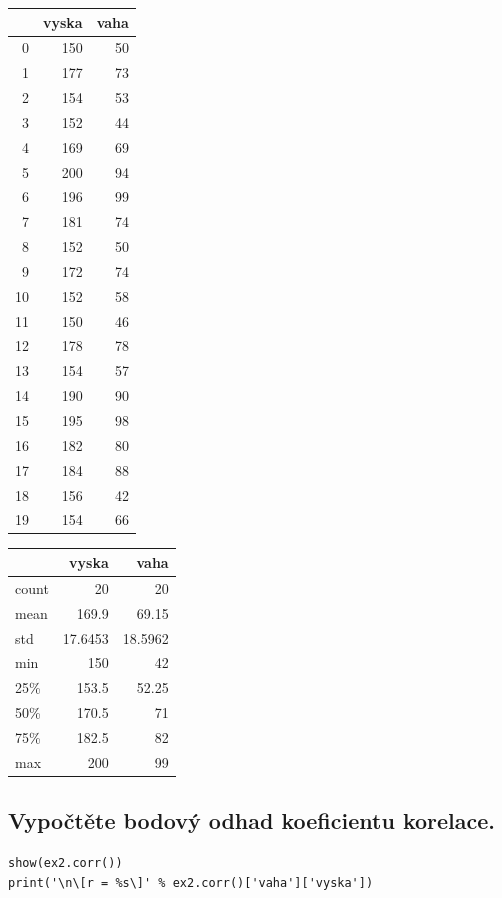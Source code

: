 \documentclass[11pt,titlepage]{article}
\begin{document}
\begin{center}
\begin{tabular}{rrr}
 & vyska & vaha\\
\hline
0 & 150 & 50\\
1 & 177 & 73\\
2 & 154 & 53\\
3 & 152 & 44\\
4 & 169 & 69\\
5 & 200 & 94\\
6 & 196 & 99\\
7 & 181 & 74\\
8 & 152 & 50\\
9 & 172 & 74\\
10 & 152 & 58\\
11 & 150 & 46\\
12 & 178 & 78\\
13 & 154 & 57\\
14 & 190 & 90\\
15 & 195 & 98\\
16 & 182 & 80\\
17 & 184 & 88\\
18 & 156 & 42\\
19 & 154 & 66\\
\end{tabular}
\end{center}

\begin{center}
\begin{tabular}{lrr}
 & vyska & vaha\\
\hline
count & 20 & 20\\
mean & 169.9 & 69.15\\
std & 17.6453 & 18.5962\\
min & 150 & 42\\
25\% & 153.5 & 52.25\\
50\% & 170.5 & 71\\
75\% & 182.5 & 82\\
max & 200 & 99\\
\end{tabular}
\end{center}

\newpage
\subsection{Vypočtěte bodový odhad koeficientu korelace.}
\label{sec:org55c56f7}

\begin{listing}[htbp]
\begin{verbatim}
show(ex2.corr())
print('\n\[r = %s\]' % ex2.corr()['vaha']['vyska'])
\end{verbatim}
\end{listing}
\end{document}

